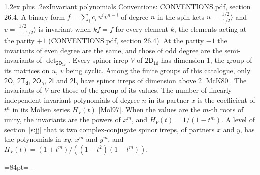 \documentclass[10pt,a4paper]{article}
\makeatletter
\renewcommand\section{\@startsection{section}{1}{\z@}{-3ex plus -1ex minus -.2ex}%
  {1.2ex plus .2ex}{\normalfont\large\sffamily\bfseries\color{parttitle}}}
\newcommand{\needspace}[1]{\par\penalty-100\begingroup\dimen0=#1\relax\dimen2=\pagegoal
  \advance\dimen2-\pagetotal\ifdim\dimen0>\dimen2\relax\ifdim\dimen2>0pt\vfil\break\fi\fi
  \endgroup}
\numberwithin{equation}{section}
\newcommand{\grp}[1]{\mathsf{#1}}
\newcommand{\jm}[2]{\bigl\lvert{}^{#1}_{\,#2}\bigr\rangle}
\makeatother
\begin{document}
\section{Invariant polynomials}\label{s:invariants}
Conventions: \href{../../CONVENTIONS.pdf}{CONVENTIONS.pdf}, section \href{../../CONVENTIONS.pdf\#conv.26.4}{26.4}.
\leavevmode\label{n:local.binary.form}A binary form $f = \sum_i c_i\, u^i v^{n-i}$ of degree $n$ in the spin kets $u = \jm{1/2}{1/2}$ and $v = \jm{1/2}{-1/2}$ is invariant when $k f = f$ for every element $k$, the elements acting at the parity $+1$ (\href{../../CONVENTIONS.pdf}{CONVENTIONS.pdf}, section \href{../../CONVENTIONS.pdf\#conv.26.4}{26.4}). At the parity $-1$ the invariants of even degree are the same, and those of odd degree are the semi-invariants of $\det_{\grp{2D_{1d}}}$.
\leavevmode\label{n:function.hilbert}Every spinor irrep $V$ of $\grp{2D_{1d}}$ has dimension 1, the group of its matrices on $u$, $v$ being cyclic. Among the finite groups of this catalogue, only $\grp{2O}$, $\grp{2T_{d}}$, $\grp{2O_{h}}$, $\grp{2I}$ and $\grp{2I_{h}}$ have spinor irreps of dimension above 2 [\href{../../../REFERENCES.pdf\#ref.McK80}{McK80}]. The invariants of $V$ are those of the group of its values. \label{n:local.partner.x}The number of linearly independent invariant polynomials of degree $n$ in its partner $x$ is the coefficient of $t^n$ in its Molien series $H_V(t)$ [\href{../../../REFERENCES.pdf\#ref.Mol97}{Mol97}]. When the values are the $m$-th roots of unity, the invariants are the powers of $x^{m}$, and $H_V(t) = 1/(1 - t^{m})$. A level of section~\ref{s:jj} that is two complex-conjugate spinor irreps, of partners $x$ and $y$, has the polynomials in $xy$, $x^{m}$ and $y^{m}$, and $H_V(t) = (1 + t^{m})/((1 - t^{2})(1 - t^{m}))$.
\needspace{84pt}
\end{document}
